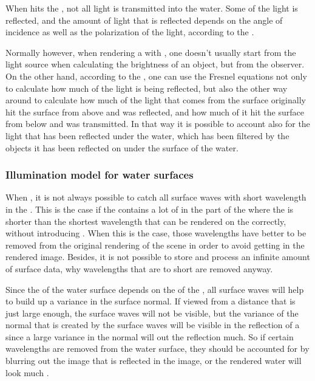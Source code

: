 When \light hits the , not all light is transmitted into the water. Some of the light is reflected, and the amount of light that is reflected depends on the angle of incidence as well as the polarization of the light, according to the .

Normally however, when rendering a \scene with , one doesn't usually start from the light source when calculating the brightness of an object, but from the observer. On the other hand, according to the , one can use the Fresnel equations not only to calculate how much of the light is being reflected, but also the other way around to calculate how much of the light that comes from the surface originally hit the surface from above and was reflected, and how much of it hit the surface from below and was transmitted. In that way it is possible to account also for the light that has been reflected under the water, which has been filtered by the objects it has been reflected on under the surface of the water.

\subsubsection{Illumination model for water surfaces}

When \rendering {}, it is not always possible to catch all surface waves with short wavelength in the . This is the case if the  contains a lot of \energy in the part of the  where the \wavelength is shorter than the shortest wavelength that can be rendered on the  correctly, without introducing \folding. When this is the case, those wavelengths have better to be removed from the original rendering of the scene in order to avoid getting  in the rendered image. Besides, it is not possible to store and process an infinite amount of surface data, why wavelengths that are to short are removed anyway.

Since the  of the water surface depends on the \gradient of the , all surface waves will help to build up a variance in the surface normal. If viewed from a distance that is just large enough, the surface waves will not be visible, but the variance of the normal that is created by the surface waves will be visible in the reflection of a  since a large variance in the normal will \blur out the reflection much. So if certain wavelengths are removed from the water surface, they should be accounted for by blurring out the image that is reflected in the image, or the rendered water will look much \smoother.

